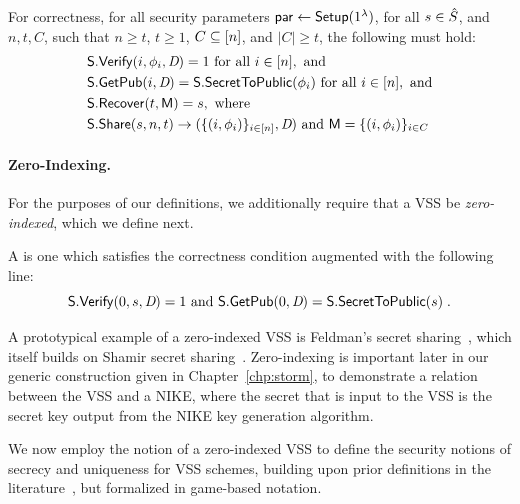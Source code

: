 For correctness, for all security parameters $\mathsf{par} \gets \mathsf{Setup}(1^\lambda)$,
for all $s \in \hat{S}$, and $n, t, C$,
such that $n \geq t$, $t \geq 1$, $C \subseteq [n]$, and $\lvert C \rvert \geq t$,
the following must hold:
    \begin{align*}
      & \mathsf{S}.\mathsf{Verify}(i, \phi_i, \textit{D}) = 1 \text{ for all } i \in [n],  \text{ and } \\
      & \mathsf{S}.\mathsf{GetPub}(i, \textit{D}) = \mathsf{S}.\mathsf{SecretToPublic}(\phi_i) \text{ for all } i \in [n], \text{ and}  \\
      & \mathsf{S}.\mathsf{Recover}(t, \mathsf{M}) = s,
      \text{ where }   \\
      & \mathsf{S}.\mathsf{Share}(s, n, t) \rightarrow ( \{ (i, \phi_i) \}_{i \in [n]}, \textit{D}) \text{ and } \mathsf{M} = \{ (i, \phi_i)\}_{i \in C}
    \end{align*}


\paragraph{Zero-Indexing.}
For the purposes of our definitions, we additionally require that a VSS be \emph{zero-indexed}, which we define next.

\begin{definition} \label{defn:zero-vss}
  A  is one which satisfies the correctness condition augmented with the following line:
\begin{equation} \label{eq:zero-index}
  \mathsf{S}.\mathsf{Verify}(0, s, \textit{D}) = 1  \text{ and } \mathsf{S}.\mathsf{GetPub}(0, \textit{D}) = \mathsf{S}.\mathsf{SecretToPublic}(s)\;.
\end{equation}
\end{definition}

A prototypical example of a zero-indexed VSS is Feldman's secret sharing~\cite{Feldman87},
which itself builds on Shamir secret sharing~\cite{Shamir79}.
Zero-indexing is important later in our generic construction given in Chapter~\ref{chp:storm},
to demonstrate a relation between the VSS and a NIKE,
where the secret that is input to the VSS is the secret key output from the
NIKE key generation algorithm.

We now employ the notion of a zero-indexed VSS to define the security notions of secrecy and uniqueness for VSS schemes,
building upon prior definitions in the literature~\cite{KatzLindell2014,BonehS2020},
but formalized in game-based notation.


